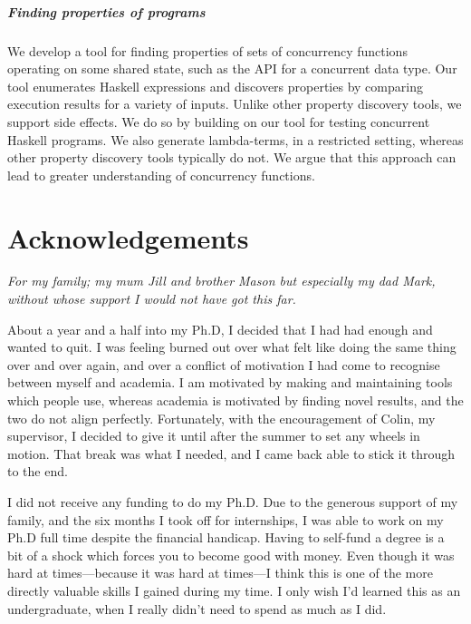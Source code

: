 \paragraph{Finding properties of programs}
We develop a tool for finding properties of sets of concurrency
functions operating on some shared state, such as the API for a
concurrent data type.  Our tool enumerates Haskell expressions and
discovers properties by comparing execution results for a variety of
inputs.  Unlike other property discovery tools, we support side
effects.  We do so by building on our tool for testing concurrent
Haskell programs.  We also generate lambda-terms, in a restricted
setting, whereas other property discovery tools typically do not.  We
argue that this approach can lead to greater understanding of
concurrency functions.

\makeatletter\renewcommand{}\makeatother
\tableofcontents
\listoffigures
\listoftables
\listoflistings

\chapter*{Acknowledgements}

\begin{displayquote}\itshape
  For my family; my mum Jill and brother Mason but especially my dad
  Mark, without whose support I would not have got this far.
\end{displayquote}

\noindent
About a year and a half into my Ph.D, I decided that I had had enough
and wanted to quit.  I was feeling burned out over what felt like
doing the same thing over and over again, and over a conflict of
motivation I had come to recognise between myself and academia.  I am
motivated by making and maintaining tools which people use, whereas
academia is motivated by finding novel results, and the two do not
align perfectly.  Fortunately, with the encouragement of Colin, my
supervisor, I decided to give it until after the summer to set any
wheels in motion.  That break was what I needed, and I came back able
to stick it through to the end.

I did not receive any funding to do my Ph.D.  Due to the generous
support of my family, and the six months I took off for internships, I
was able to work on my Ph.D full time despite the financial handicap.
Having to self-fund a degree is a bit of a shock which forces you to
become good with money.  Even though it was hard at times---because it
was hard at times---I think this is one of the more directly valuable
skills I gained during my time.  I only wish I'd learned this as an
undergraduate, when I really didn't need to spend as much as I did.

